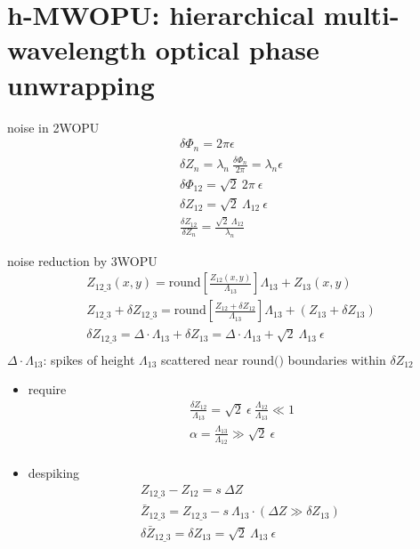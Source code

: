 \documentclass[t, aspectratio=169]{beamer}
\begin{document}
\section{h-MWOPU: hierarchical multi-wavelength optical phase unwrapping}
\begin{frame}[c]
\centering\LARGE\textbf{\secname}
\end{frame}


\begin{frame}{noise in 2WOPU}
\begin{gather*}
\delta\Phi_n = 2\pi\epsilon \\
\delta Z_n = \lambda_n\ \frac{\delta\Phi_n}{2\pi} = \lambda_n\epsilon \\
\delta\Phi_{12} = \sqrt{2}\ 2\pi\ \epsilon \\
\delta Z_{12} = \sqrt{2}\ \Lambda_{12}\ \epsilon \\
\frac{\delta Z_{12}}{\delta Z_n} = \frac{\sqrt{2}\ \Lambda_{12}}{\lambda_n}
\end{gather*}
\end{frame}


\begin{frame}[allowframebreaks]{noise reduction by 3WOPU}
\begin{gather*}
Z_{12\_3}(x,y) = \textrm{round}\left[\frac{Z_{12}(x,y)}{\Lambda_{13}}\right] \Lambda_{13} + Z_{13}(x,y) \\
Z_{12\_3} + \delta Z_{12\_3} = \textrm{round}\left[\frac{Z_{12} + \delta Z_{12}}{\Lambda_{13}} \right] \Lambda_{13} + (Z_{13} + \delta Z_{13}) \\
\delta Z_{12\_3} = \Delta\cdot \Lambda_{13} + \delta Z_{13} = \Delta\cdot\Lambda_{13} + \sqrt{2}\ \Lambda_{13}\ \epsilon \\
\end{gather*}
$\Delta\cdot\Lambda_{13}$: 		spikes of height $\Lambda_{13}$ scattered near $\textrm{round()}$ boundaries within $\delta Z_{12}$ \\
\begin{itemize}
\item require
\begin{gather*}
\frac{\delta Z_{12}}{\Lambda_{13}} = \sqrt{2}\ \epsilon\ \frac{\Lambda_{12}}{\Lambda_{13}} \ll 1 \\
\alpha = \frac{\Lambda_{13}}{\Lambda_{12}} \gg \sqrt{2}\ \epsilon \\
\end{gather*}
\item despiking
\begin{gather*}
Z_{12\_3} - Z_{12} = s\ \Delta Z \\
\bar{Z}_{12\_3} = Z_{12\_3} - s\ \Lambda_{13}\cdot\left(\Delta Z \gg \delta Z_{13}\right)\  \\
\delta\bar{Z}_{12\_3} = \delta Z_{13} = \sqrt{2}\ \Lambda_{13}\ \epsilon
\end{gather*}
\end{itemize}
\end{frame}
\end{document}
